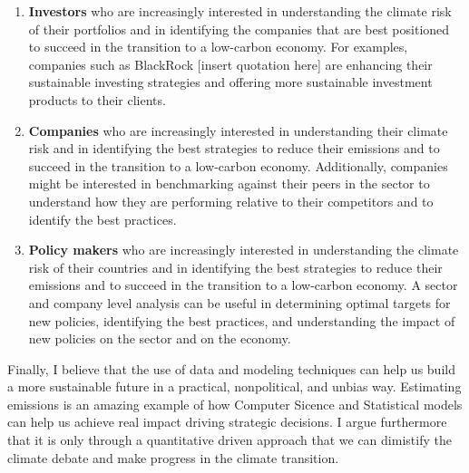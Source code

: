  \begin{enumerate}
    \item \textbf{Investors} who are increasingly interested in understanding the climate risk of their portfolios and in identifying the companies that are best positioned to succeed in the transition to a low-carbon economy. For examples, companies such as BlackRock [insert quotation here] are enhancing their sustainable investing strategies and offering more sustainable investment products to their clients.
    \item \textbf{Companies} who are increasingly interested in understanding their climate risk and in identifying the best strategies to reduce their emissions and to succeed in the transition to a low-carbon economy. Additionally, companies might be interested in benchmarking against their peers in the sector to understand how they are performing relative to their competitors and to identify the best practices. 
    \item \textbf{Policy makers} who are increasingly interested in understanding the climate risk of their countries and in identifying the best strategies to reduce their emissions and to succeed in the transition to a low-carbon economy. A sector and company level analysis can be useful in determining optimal targets for new policies, identifying the best practices, and understanding the impact of new policies on the sector and on the economy.
\end{enumerate}

\noindent Finally, I believe that the use of data and modeling techniques  can help us build a more sustainable future in a practical, nonpolitical, and unbias way. Estimating emissions is an amazing example of how Computer Sicence and Statistical models can help us achieve real impact driving strategic decisions. I argue furthermore that it is only through a quantitative driven approach that we can dimistify the climate debate and make progress in the climate transition.

